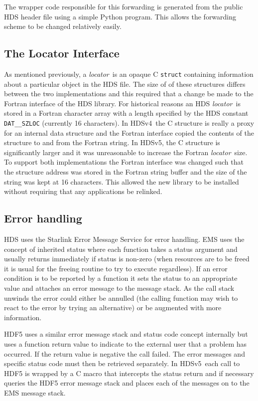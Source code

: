 \documentclass[final,authoryear,5p,times,twocolumn]{elsarticle}
\newcommand{\locator}{\emph{locator}}
\newcommand{\new}{HDSv5}
\newcommand{\old}{HDSv4}
\begin{document}
The wrapper code responsible for this forwarding is generated from the
public HDS header file using a simple Python program. This allows the
forwarding scheme to be changed relatively easily.


\subsection{The Locator Interface}

As mentioned previously, a \locator\ is an opaque C \texttt{struct}
containing information about a particular object in the HDS file. The
size of of these structures differs between the two
implementations and this required that a change be made to the Fortran
interface of the HDS library. For historical reasons an HDS \locator\
is stored in a Fortran character array with a length specified by the
HDS constant \texttt{DAT\_\_SZLOC} (currently 16 characters). In
\old\ the C structure is really a proxy for an internal data
structure and the Fortran interface copied the contents of the
structure to and from the Fortran string. In \new, the C
structure is significantly larger and it was unreasonable to increase
the Fortran \locator\ size. To support both implementations the
Fortran interface was changed such that the structure address was
stored in the Fortran string buffer and the size of the string was
kept at 16 characters. This allowed the new library to be installed
without requiring that any applications be relinked.


\subsection{Error handling}

HDS uses the Starlink Error Message Service \citep[EMS;][]{SSN4} for
error handling. EMS uses the concept of inherited status where each
function takes a status argument and usually returns immediately if
status is non-zero (when resources are to be freed it is usual for the
freeing routine to try to execute regardless). If an error condition
is to be reported by a function it sets the status to an appropriate
value and attaches an error message to the message stack. As the call
stack unwinds the error could either be annulled (the calling function
may wish to react to the error by trying an alternative) or be
augmented with more information.

HDF5 uses a similar error message stack and status code concept
internally but uses a function return value to indicate to the
external user that a problem has occurred. If the return value is
negative the call failed. The error messages and specific status code
must then be retrieved separately. In \new\ each call to HDF5 is
wrapped by a C macro that intercepts the status return and if
necessary queries the HDF5 error message stack and places each of the
messages on to the EMS message stack.
\end{document}
